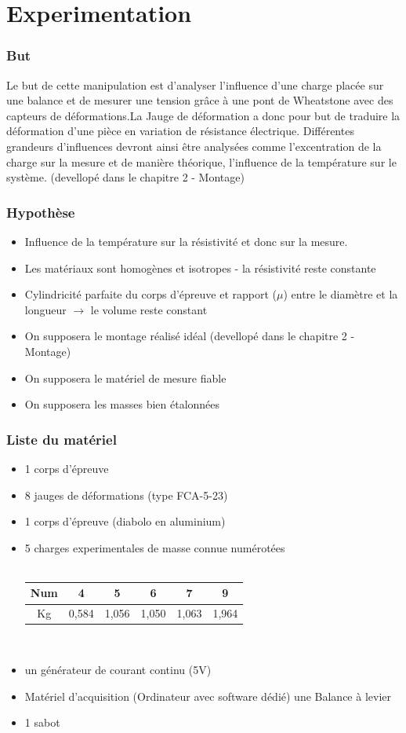 \documentclass[11pt,a4paper]{report}
\begin{document}
\part{Experimentation}
\section*{But}
Le but de cette manipulation est d'analyser l'influence d'une charge placée sur une balance et de mesurer une tension grâce à une pont de Wheatstone avec des capteurs de déformations.La Jauge de déformation a donc pour but de traduire la déformation d'une pièce en variation de résistance électrique. Différentes grandeurs d'influences devront ainsi être analysées comme l'excentration de la charge sur la mesure et de manière théorique, l'influence de la température sur le système. (devellopé dans le chapitre 2 - Montage)
\section*{Hypothèse}
\begin{itemize}
\item Influence de la température sur la résistivité et donc sur la mesure.
\item Les matériaux sont homogènes et isotropes - la résistivité reste constante
\item Cylindricité parfaite du corps d'épreuve et rapport ($\mu$) entre le diamètre et la longueur $\rightarrow$ le volume reste constant
\item On supposera le montage réalisé idéal (devellopé dans le chapitre 2 - Montage)
\item On supposera le matériel de mesure fiable
\item On supposera les masses bien étalonnées
\end{itemize}	

\section*{Liste du matériel}
\begin{itemize}
\item 1 corps d'épreuve
\item 8 jauges de déformations (type FCA-5-23)
\item 1 corps d'épreuve (diabolo en aluminium)
\item 5 charges experimentales de masse connue numérotées ~\\~\\
\begin{tabular}{|c|c|c|c|c|c|}
\hline 
Num & 4 & 5 & 6 & 7 & 9 \\ \hline
Kg    & 0,584 & 1,056 & 1,050 & 1,063 & 1,964 \\ \hline
\end{tabular}~\\
\item un générateur de courant continu (5V)
\item Matériel d'acquisition (Ordinateur avec software dédié)   une Balance à levier
\item 1 sabot
\end{itemize}
\newpage	
\end{document}
